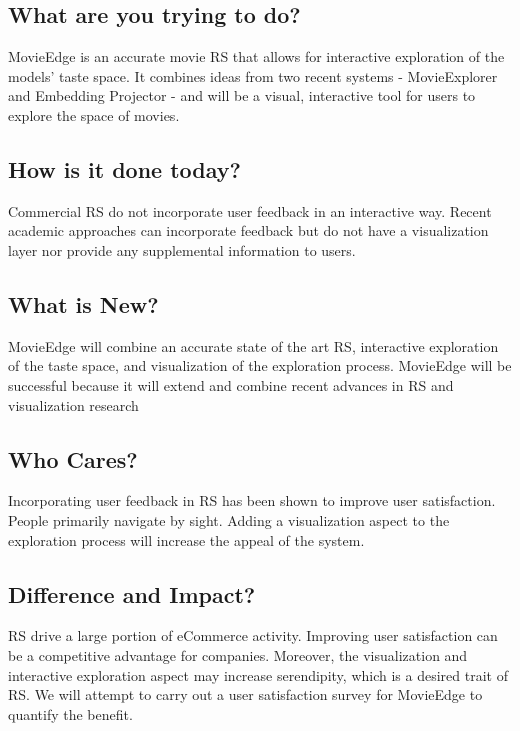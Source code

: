 \subsection{What are you trying to do?} 

MovieEdge is an accurate movie RS that allows for interactive exploration of the models’ taste space. It combines ideas from two recent systems - MovieExplorer and Embedding Projector - and will be a visual, interactive tool for users to explore the space of movies. 

\subsection{How is it done today?}

Commercial RS do not incorporate user feedback in an interactive way. Recent academic approaches can incorporate feedback but do not have a visualization layer nor provide any supplemental information to users.  

\subsection{What is New?}

MovieEdge will combine an accurate state of the art RS, interactive exploration of the taste space, and visualization of the exploration process. MovieEdge will be successful because it will extend and combine recent advances in RS and visualization research

\subsection{Who Cares?}

Incorporating user feedback in RS has been shown to improve user satisfaction. People primarily navigate by sight. Adding a visualization aspect to the exploration process will increase the appeal of the system. 

\subsection{Difference and Impact?}

RS drive a large portion of eCommerce activity. Improving user satisfaction can be a competitive advantage for companies. Moreover, the visualization and interactive exploration aspect may increase serendipity, which is a desired trait of RS.  We will attempt to carry out a user satisfaction survey for MovieEdge to quantify the benefit. 

